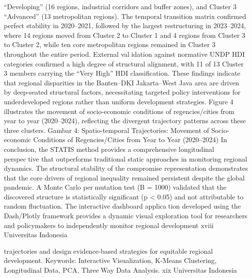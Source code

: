“Developing” (16 regions, industrial corridors and buffer zones), and Cluster 3 “Advanced”
(13 metropolitan regions). The temporal transition matrix confirmed perfect stability in
2020–2021, followed by the largest restructuring in 2023–2024, where 14 regions moved
from Cluster 2 to Cluster 1 and 4 regions from Cluster 3 to Cluster 2, while ten core
metropolitan regions remained in Cluster 3 throughout the entire period. External validation against normative UNDP HDI categories confirmed a high degree of structural
alignment, with 11 of 13 Cluster 3 members carrying the “Very High” HDI classification.
These findings indicate that regional disparities in the Banten–DKI Jakarta–West Java area
are driven by deep-seated structural factors, necessitating targeted policy interventions for
underdeveloped regions rather than uniform development strategies. Figure 4 illustrates the
movement of socio-economic conditions of regencies/cities from year to year (2020–2024),
reflecting the divergent trajectory patterns across these three clusters.
Gambar 4: Spatio-temporal Trajectories: Movement of Socio-economic Conditions of
Regencies/Cities from Year to Year (2020–2024)
In conclusion, the STATIS method provides a comprehensive longitudinal perspective that outperforms traditional static approaches in monitoring regional dynamics. The
structural stability of the compromise representation demonstrates that the core drivers of
regional inequality remained persistent despite the global pandemic. A Monte Carlo permutation test (B = 1000) validated that the discovered structure is statistically significant
(p < 0.05) and not attributable to random fluctuation. The interactive dashboard application developed using the Dash/Plotly framework provides a dynamic visual exploration
tool for researchers and policymakers to independently monitor regional development
xviii Universitas Indonesia

trajectories and design evidence-based strategies for equitable regional development.
Keywords: Interactive Visualization, K-Means Clustering, Longitudinal Data, PCA, ThreeWay Data Analysis.
xix Universitas Indonesia

